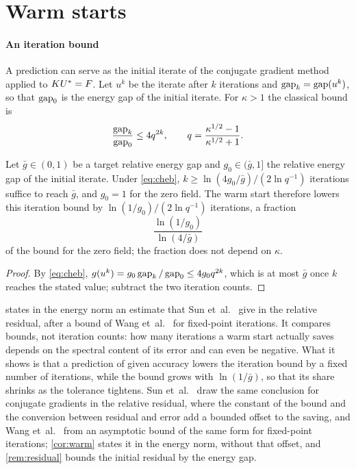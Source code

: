 \section{Warm starts}\label{supp:warm}

\paragraph{An iteration bound}
A prediction can serve as the initial iterate of the conjugate gradient method
\cite{HestenesStiefel1952} applied to $KU^{\ast}=F$. Let $u^k$ be the iterate after $k$
iterations and $\operatorname{gap}_k=\operatorname{gap}(u^k)$, so that $\operatorname{gap}_0$ is the energy gap of the initial
iterate. For $\kappa>1$ the classical bound \cite[Section~6.11.3]{Saad2003} is
\begin{equation}
\frac{\operatorname{gap}_k}{\operatorname{gap}_0} \le 4q^{2k},
\qquad
q = \frac{\kappa^{1/2}-1}{\kappa^{1/2}+1}.
\label{eq:cheb}
\end{equation}

\begin{corollary}\label{cor:warm}
Let $\bar g\in(0,1)$ be a target relative energy gap and $g_0\in(\bar g,1]$ the relative
energy gap of the initial iterate. Under \eqref{eq:cheb}, $k\ge\ln(4g_0/\bar g)/(2\ln
q^{-1})$ iterations suffice to reach $\bar g$, and $g_0=1$ for the zero field. The warm
start therefore lowers this iteration bound by $\ln(1/g_0)/(2\ln q^{-1})$ iterations, a
fraction
\begin{equation}
\frac{\ln(1/g_0)}{\ln(4/\bar g)}
\label{eq:warm}
\end{equation}
of the bound for the zero field; the fraction does not depend on $\kappa$.
\end{corollary}

\begin{proof}
By \eqref{eq:cheb}, $g(u^k)=g_0\operatorname{gap}_k/\operatorname{gap}_0\le4g_0q^{2k}$, which is at most $\bar g$ once
$k$ reaches the stated value; subtract the two iteration counts.
\end{proof}

 states in the energy norm an estimate that Sun et~al.~\cite{Sun2026FEVessel}
give in the relative residual, after a bound of Wang et~al.~\cite{Wang2026PretrainFEM} for
fixed-point iterations. It compares bounds, not iteration counts: how many iterations a warm
start actually saves depends on the spectral content of its error and can even be negative.
What it shows is that a prediction of given accuracy lowers the iteration bound by a fixed
number of iterations, while the bound grows with $\ln(1/\bar g)$, so that its share shrinks
as the tolerance tightens. Sun et~al.~\cite{Sun2026FEVessel} draw the same conclusion for
conjugate gradients in the relative residual, where the constant of the bound and the
conversion between residual and error add a bounded offset to the saving, and Wang
et~al.~\cite{Wang2026PretrainFEM} from an asymptotic bound of the same form for fixed-point
iterations; \cref{cor:warm} states it in the energy norm, without that offset, and
\cref{rem:residual} bounds the initial residual by the energy gap.

